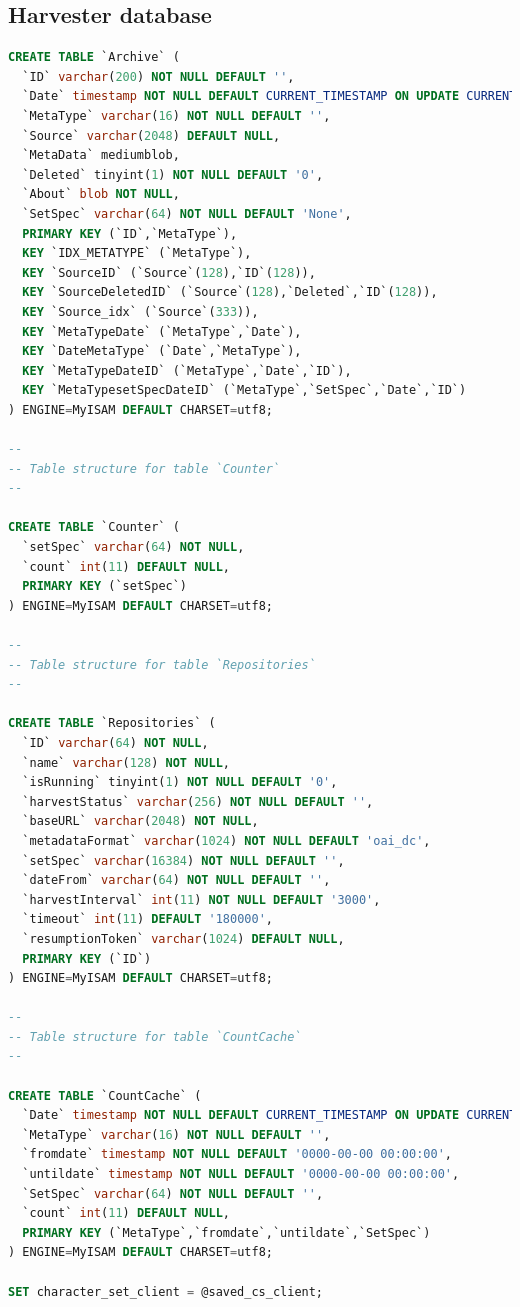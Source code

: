 \documentclass[a4paper,11pt]{article}
\begin{document}
\subsection{Harvester database}
\label{sec:database_schema:harvester_database}

\begin{lstlisting}[language=SQL]
CREATE TABLE `Archive` (
  `ID` varchar(200) NOT NULL DEFAULT '', 
  `Date` timestamp NOT NULL DEFAULT CURRENT_TIMESTAMP ON UPDATE CURRENT_TIMESTAMP,
  `MetaType` varchar(16) NOT NULL DEFAULT '', 
  `Source` varchar(2048) DEFAULT NULL,
  `MetaData` mediumblob,
  `Deleted` tinyint(1) NOT NULL DEFAULT '0',
  `About` blob NOT NULL,
  `SetSpec` varchar(64) NOT NULL DEFAULT 'None',
  PRIMARY KEY (`ID`,`MetaType`),
  KEY `IDX_METATYPE` (`MetaType`),
  KEY `SourceID` (`Source`(128),`ID`(128)),
  KEY `SourceDeletedID` (`Source`(128),`Deleted`,`ID`(128)),
  KEY `Source_idx` (`Source`(333)),
  KEY `MetaTypeDate` (`MetaType`,`Date`),
  KEY `DateMetaType` (`Date`,`MetaType`),
  KEY `MetaTypeDateID` (`MetaType`,`Date`,`ID`),
  KEY `MetaTypesetSpecDateID` (`MetaType`,`SetSpec`,`Date`,`ID`)
) ENGINE=MyISAM DEFAULT CHARSET=utf8;   

--
-- Table structure for table `Counter`
--

CREATE TABLE `Counter` (
  `setSpec` varchar(64) NOT NULL,
  `count` int(11) DEFAULT NULL,
  PRIMARY KEY (`setSpec`)
) ENGINE=MyISAM DEFAULT CHARSET=utf8;

--
-- Table structure for table `Repositories`
--

CREATE TABLE `Repositories` (
  `ID` varchar(64) NOT NULL,
  `name` varchar(128) NOT NULL,
  `isRunning` tinyint(1) NOT NULL DEFAULT '0',
  `harvestStatus` varchar(256) NOT NULL DEFAULT '',
  `baseURL` varchar(2048) NOT NULL,
  `metadataFormat` varchar(1024) NOT NULL DEFAULT 'oai_dc',
  `setSpec` varchar(16384) NOT NULL DEFAULT '',
  `dateFrom` varchar(64) NOT NULL DEFAULT '',
  `harvestInterval` int(11) NOT NULL DEFAULT '3000',
  `timeout` int(11) DEFAULT '180000',
  `resumptionToken` varchar(1024) DEFAULT NULL,
  PRIMARY KEY (`ID`)
) ENGINE=MyISAM DEFAULT CHARSET=utf8;

--
-- Table structure for table `CountCache`
--

CREATE TABLE `CountCache` (
  `Date` timestamp NOT NULL DEFAULT CURRENT_TIMESTAMP ON UPDATE CURRENT_TIMESTAMP,
  `MetaType` varchar(16) NOT NULL DEFAULT '',
  `fromdate` timestamp NOT NULL DEFAULT '0000-00-00 00:00:00',
  `untildate` timestamp NOT NULL DEFAULT '0000-00-00 00:00:00',
  `SetSpec` varchar(64) NOT NULL DEFAULT '',
  `count` int(11) DEFAULT NULL,
  PRIMARY KEY (`MetaType`,`fromdate`,`untildate`,`SetSpec`)
) ENGINE=MyISAM DEFAULT CHARSET=utf8;

SET character_set_client = @saved_cs_client;

\end{lstlisting}
\end{document}
